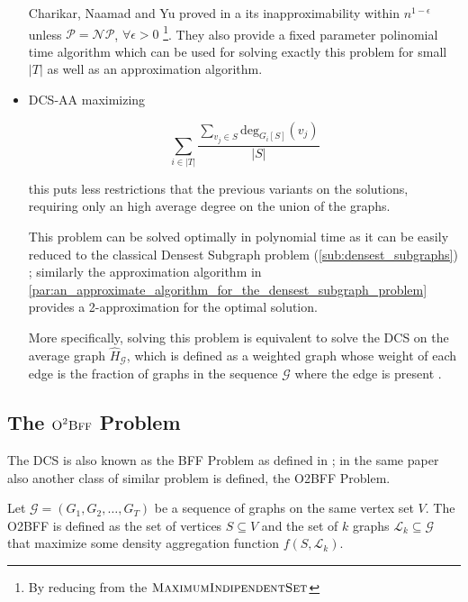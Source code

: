 \begin{itemize}
	      Charikar, Naamad and Yu proved in \cite{charikar2018finding} a
	      its inapproximability within $n^{1-\epsilon} $ unless
	      $\mathcal{P} = \mathcal{NP}  $, $\forall \epsilon > 0$
	      \footnote{By reducing from the
		      $\textsc{MaximumIndipendentSet}$}. They also provide a fixed
	      parameter polinomial time algorithm which can be used for solving
	      exactly this problem for small $|T|$ as well as an approximation
	      algorithm.
	\item \acrshort{DCS}-AA maximizing

	      \begin{equation}
		      \label{eq:dcs-aa}
		      \sum^{}_{i \in |T|} \frac{\sum^{}_{v_{j} \in S} \text{deg}_{G_i[S]}
		      (v_{j} )}{|S|}
	      \end{equation}

	      this puts less restrictions that the previous variants on the
	      solutions, requiring only an high average degree on the union of the
	      graphs.

	      This problem can be solved optimally in polynomial time as it can be
	      easily reduced to the classical Densest Subgraph problem
	      (\autoref{sub:densest_subgraphs}) \cite{semertzidis2019finding};
	      similarly the approximation algorithm in
	      \autoref{par:an_approximate_algorithm_for_the_densest_subgraph_problem}
	      provides a 2-approximation for the optimal solution.

	      More specifically, solving this problem is equivalent to solve the
	      \acrfull{DCS} on the average graph $\hat{H}_{\mathcal{G} }  $, which
	      is defined as a weighted graph whose weight of each edge is the
	      fraction of graphs in the sequence $\mathcal{G} $ where the edge is
	      present \cite{semertzidis2019finding}.
\end{itemize}

\subsection{The $\textsc{O}^{2} \textsc{Bff}$ Problem}%
\label{sub:the_o_2_bff_problem}

The \acrshort{DCS} is also known as the \acrfull{BFF} Problem as defined in
\cite{semertzidis2019finding}; in the same paper also another class of similar
problem is defined, the \acrlong{O2BFF} Problem.

Let $\mathcal{G} = (G_1, G_2, \dots, G_T) $ be a sequence of graphs on the same
vertex set $V$. The \acrfull{O2BFF} is defined as the set of
vertices $S \subseteq V$ and the set of $k$ graphs $\mathcal{L}_{k} \subseteq
	\mathcal{G}  $ that maximize some density aggregation function $f(S,
	\mathcal{L}_{k}) $.


